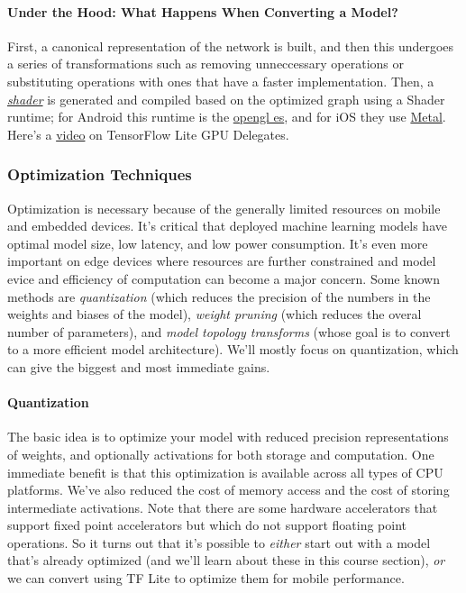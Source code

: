 \documentclass[12pt]{article}
\begin{document}
\paragraph{Under the Hood: What Happens When Converting a Model?} First, a canonical representation of the network is built,
and then this undergoes a series of transformations such as removing unneccessary operations or substituting operations with ones
that have a faster implementation. Then, a \href{https://en.wikipedia.org/wiki/Shader}{\emph{shader}}
is generated and compiled based on the optimized graph using a
Shader runtime; for Android this runtime is the \href{https://en.wikipedia.org/wiki/OpenGL_ES}{opengl es}, and for
iOS they use \href{https://en.wikipedia.org/wiki/Metal_(API)}{Metal}. Here's a \href{https://www.youtube.com/watch?v=QSbAUxWfxQw}{video} on TensorFlow Lite GPU Delegates.

\subsubsection{Optimization Techniques} Optimization is necessary because of the generally limited
resources on mobile and embedded devices.  It's critical that deployed machine learning models have
optimal model size, low latency, and low power consumption. It's even more important on edge devices where
resources are further constrained and model evice and efficiency of computation can become a major concern.
Some known methods are \emph{quantization} (which reduces the precision of the numbers in the weights
and biases of the model), \emph{weight pruning} (which reduces the overal number of parameters), and
\emph{model topology transforms} (whose goal is to convert to a more efficient model architecture). We'll mostly focus on
quantization, which can give the biggest and most immediate gains.

\paragraph{Quantization} The basic idea is to optimize your model with reduced precision representations of
weights, and optionally activations for both storage and computation. One immediate benefit is that this optimization
is available across all types of CPU platforms. We've also reduced the cost of memory access and the cost of storing
intermediate activations. Note that there are some hardware accelerators that support fixed point accelerators but which
do not support floating point operations. So it turns out that it's possible to \emph{either} start out with a model
that's already optimized (and we'll learn about these in this course section), \emph{or} we can convert using TF Lite
to optimize them for mobile performance.
\end{document}
